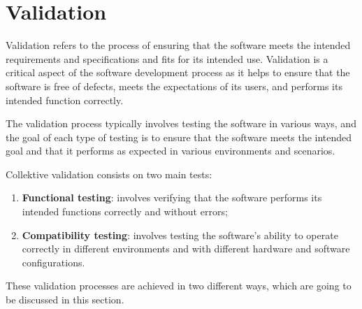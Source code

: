 \section{Validation}\label{section:validation}
Validation refers to the process of ensuring that the software meets the intended requirements and specifications and fits for its intended use. Validation is a critical aspect of the software development process as it helps to ensure that the software is free of defects, meets the expectations of its users, and performs its intended function correctly.

The validation process typically involves testing the software in various ways, and the goal of each type of testing is to ensure that the software meets the intended goal and that it performs as expected in various environments and scenarios.

Collektive validation consists on two main tests:
\begin{enumerate}
    \item \textbf{Functional testing}: involves verifying that the software performs its intended functions correctly and without errors;
    \item \textbf{Compatibility testing}: involves testing the software's ability to operate correctly in different environments and with different hardware and software configurations.
\end{enumerate}
These validation processes are achieved in two different ways, which are going to be discussed in this section.

